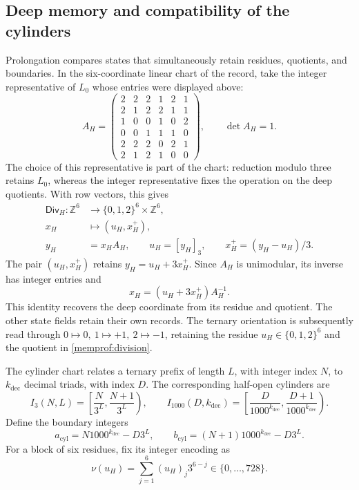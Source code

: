 \subsection{Deep memory and compatibility of the cylinders}
\label{memprof:seccion}

Prolongation compares states that simultaneously retain residues,
quotients, and boundaries. In the six-coordinate linear chart of the
record, take the integer representative of \(L_0\) whose entries were
displayed above:
\[
 A_H=\begin{pmatrix}
 2&2&2&1&2&1\\2&1&2&2&1&1\\1&0&0&1&0&2\\
 0&0&1&1&1&0\\2&2&2&0&2&1\\2&1&2&1&0&0
 \end{pmatrix},\qquad\det A_H=1.
\]
The choice of this representative is part of the chart: reduction modulo
three retains \(L_0\), whereas the integer representative fixes the
operation on the deep quotients. With row vectors, this gives
\begin{equation}
 \begin{aligned}
 \mathsf{Div}_H:\mathbb Z^6&\longrightarrow
       \{0,1,2\}^6\times\mathbb Z^6,\\
 x_H&\longmapsto(u_H,x_H^+),\\
 y_H&=x_HA_H,\qquad u_H=[y_H]_3,\qquad
 x_H^+=(y_H-u_H)/3 .
 \end{aligned}
 \label{memprof:division}
\end{equation}
The pair \((u_H,x_H^+)\) retains \(y_H=u_H+3x_H^+\). Since
\(A_H\) is unimodular, its inverse has integer entries and
\begin{equation}
 x_H=(u_H+3x_H^+)A_H^{-1}.
 \label{memprof:inversa}
\end{equation}
This identity recovers the deep coordinate from its residue and quotient.
The other state fields retain their own records. The ternary orientation
is subsequently read through
\(0\mapsto0,\ 1\mapsto+1,\ 2\mapsto-1\), retaining the residue
\(u_H\in\{0,1,2\}^6\) and the quotient in \eqref{memprof:division}.

The cylinder chart relates a ternary prefix of length \(L\), with integer
index \(N\), to \(k_{\mathrm{dec}}\) decimal triads, with index \(D\).
The corresponding half-open cylinders are
\[
 I_3(N,L)=\left[\frac N{3^L},\frac{N+1}{3^L}\right),\qquad
 I_{1000}(D,k_{\mathrm{dec}})
 =\left[\frac D{1000^{k_{\mathrm{dec}}}},
         \frac{D+1}{1000^{k_{\mathrm{dec}}}}\right).
\]
Define the boundary integers
\[
 a_{\mathrm{cyl}}=N1000^{k_{\mathrm{dec}}}-D3^L,\qquad
 b_{\mathrm{cyl}}=(N+1)1000^{k_{\mathrm{dec}}}-D3^L.
\]
For a block of six residues, fix its integer encoding as
\[
 \nu(u_H)=\sum_{j=1}^6(u_H)_j3^{6-j}
 \in\{0,\ldots,728\}.
\]


